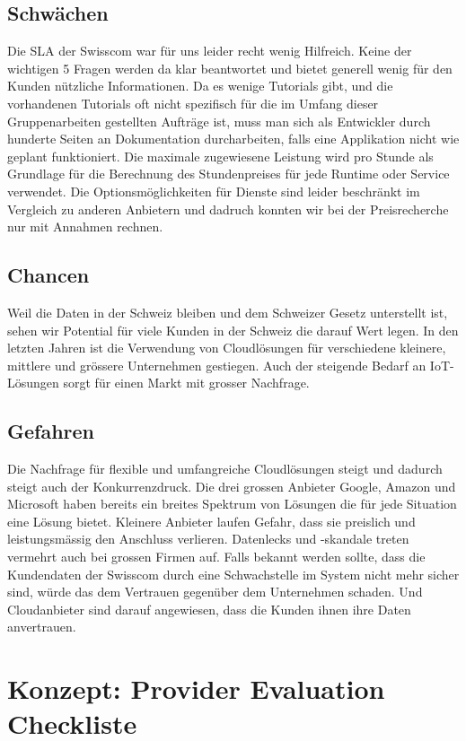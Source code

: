 \documentclass[11pt,titlepage]{article}
\begin{document}
\subsection{Schwächen}
Die SLA der Swisscom war für uns leider recht wenig Hilfreich. Keine der wichtigen 5 Fragen werden da klar beantwortet und bietet generell wenig für den Kunden nützliche Informationen.
Da es wenige Tutorials gibt, und die vorhandenen Tutorials oft nicht spezifisch für die im Umfang dieser Gruppenarbeiten gestellten Aufträge ist, muss man sich als Entwickler durch hunderte Seiten an Dokumentation durcharbeiten, falls eine Applikation nicht wie geplant funktioniert.
Die maximale zugewiesene Leistung wird pro Stunde als Grundlage für die Berechnung des Stundenpreises für jede Runtime oder Service verwendet.
Die Optionsmöglichkeiten für Dienste sind leider beschränkt im Vergleich zu anderen Anbietern und dadruch konnten wir bei der Preisrecherche nur mit Annahmen rechnen.

\subsection{Chancen}
Weil die Daten in der Schweiz bleiben und dem Schweizer Gesetz unterstellt ist, sehen wir Potential für viele Kunden in der Schweiz die darauf Wert legen.
In den letzten Jahren ist die Verwendung von Cloudlösungen für verschiedene kleinere, mittlere und grössere Unternehmen gestiegen. Auch der steigende Bedarf an IoT-Lösungen sorgt für einen Markt mit grosser Nachfrage.

\subsection{Gefahren}
Die Nachfrage für flexible und umfangreiche Cloudlösungen steigt und dadurch steigt auch der Konkurrenzdruck. Die drei grossen Anbieter Google, Amazon und Microsoft haben bereits ein breites Spektrum von Lösungen die für jede Situation eine Lösung bietet. Kleinere Anbieter laufen Gefahr, dass sie preislich und leistungsmässig den Anschluss verlieren.
Datenlecks und -skandale treten vermehrt auch bei grossen Firmen auf. Falls bekannt werden sollte, dass die Kundendaten der Swisscom durch eine Schwachstelle im System nicht mehr sicher sind, würde das dem Vertrauen gegenüber dem Unternehmen schaden. Und Cloudanbieter sind darauf angewiesen, dass die Kunden ihnen ihre Daten anvertrauen.

\section{Konzept: Provider Evaluation Checkliste}
\label{sec:konzeptProviderEvaluation}
\end{document}

